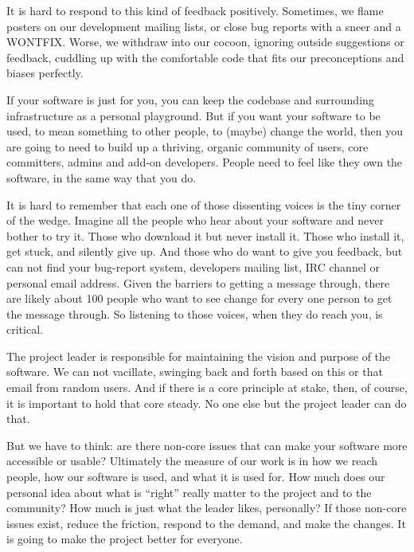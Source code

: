 It is hard to respond to this kind of feedback positively. Sometimes, we flame
posters on our development mailing lists, or close bug reports with a sneer and
a WONTFIX. Worse, we withdraw into our cocoon, ignoring outside suggestions or
feedback, cuddling up with the comfortable code that fits our preconceptions and
biases perfectly.

If your software is just for you, you can keep the codebase and surrounding
infrastructure as a personal playground. But if you want your software to be
used, to mean something to other people, to (maybe) change the world, then
you are going to need to build up a thriving, organic community of users, core
committers, admins and add-on developers. People need to feel like they own the
software, in the same way that you do.

It is hard to remember that each one of those dissenting voices is the tiny
corner of the wedge. Imagine all the people who hear about your software and
never bother to try it. Those who download it but never install it. Those who
install it, get stuck, and silently give up. And those who do want to give you
feedback, but can not find your bug-report system, developers mailing list, IRC
channel or personal email address. Given the barriers to getting a message
through, there are likely about 100 people who want to see change for
every one person to get the message through. So listening to those voices, when
they do reach you, is critical.

The project leader is responsible for maintaining the vision and purpose of the
software. We can not vacillate, swinging back and forth based on this or that
email from random users. And if there is a core principle at stake, then, of
course, it is important to hold that core steady. No one else but the project
leader can do that.

But we have to think: are there non-core issues that can make your software more
accessible or usable? Ultimately the measure of our work is in how we reach people, how our software is used, and what it is used for. How much does our personal idea about what is ``right'' really matter to the project and to the community? How much is just what the leader likes, personally? If those non-core issues exist, reduce the friction, respond to the demand, and make the changes. It is going to make the project better for everyone.
